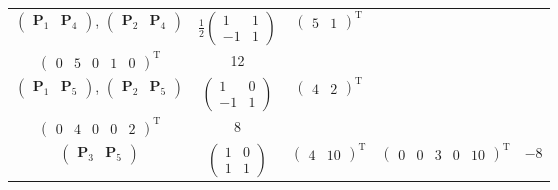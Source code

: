 \begin{enumerate}[label=\alph*)]
\begin{table}[ht]
{\begin{tabular}{ccccc}
                    $\begin{pmatrix}\bm{P}_1 & \bm{P}_4\end{pmatrix}$, $\begin{pmatrix}\bm{P}_2 & \bm{P}_4\end{pmatrix}$ &
                    $\frac{1}{2}\begin{pmatrix} 1 & 1 \\ -1 & 1 \end{pmatrix}$ &
                    $\begin{pmatrix}5 & 1\end{pmatrix}^\mathrm{T}$ &
                    \makecell[c]{
                        $\begin{pmatrix}5 & 0 & 0 & 1 & 0\end{pmatrix}^\mathrm{T}$ \\
                        $\begin{pmatrix}0 & 5 & 0 & 1 & 0\end{pmatrix}^\mathrm{T}$
                    } &
                    12 \\

                    $\begin{pmatrix}\bm{P}_1 & \bm{P}_5\end{pmatrix}$, $\begin{pmatrix}\bm{P}_2 & \bm{P}_5\end{pmatrix}$&
                    $\begin{pmatrix} 1 & 0 \\ -1 & 1 \end{pmatrix}$ &
                    $\begin{pmatrix}4 & 2\end{pmatrix}^\mathrm{T}$ &
                    \makecell[c]{
                        $\begin{pmatrix}4 & 0 & 0 & 0 & 2\end{pmatrix}^\mathrm{T}$ \\
                        $\begin{pmatrix}0 & 4 & 0 & 0 & 2\end{pmatrix}^\mathrm{T}$
                    } &
                    8 \\

                    $\begin{pmatrix}\bm{P}_3 & \bm{P}_5\end{pmatrix}$ &
                    $\begin{pmatrix} 1 & 0 \\ 1 & 1 \end{pmatrix}$ &
                    $\begin{pmatrix}4 & 10\end{pmatrix}^\mathrm{T}$ &
                    $\begin{pmatrix}0 & 0 & 3 & 0 & 10\end{pmatrix}^\mathrm{T}$ &
                    $-8$ \\


\end{tabular}}
\end{table}
\end{enumerate}
